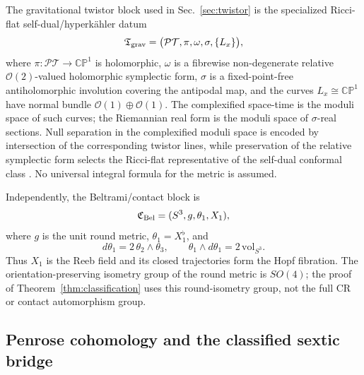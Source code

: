 \documentclass[aps,prd,reprint,nofootinbib,superscriptaddress]{revtex4-2}
\theoremstyle{definition}
\theoremstyle{remark}
\newcommand{\CP}{\mathbb{CP}}
\newcommand{\cO}{\mathcal{O}}
\newcommand{\PT}{\mathcal{PT}}
\begin{document}
The gravitational twistor block used in Sec.~\ref{sec:twistor} is the specialized Ricci-flat self-dual/hyperk\"ahler datum
\begin{equation}
\mathfrak T_{\rm grav}
=\bigl(\PT,\pi,\omega,\sigma,\{L_x\}\bigr),
\label{eq:Tgrav}
\end{equation}
where $\pi:\PT\to\CP^1$ is holomorphic, $\omega$ is a fibrewise non-degenerate relative $\cO(2)$-valued holomorphic symplectic form, $\sigma$ is a fixed-point-free antiholomorphic involution covering the antipodal map, and the curves $L_x\cong\CP^1$ have normal bundle $\cO(1)\oplus\cO(1)$.  The complexified space-time is the moduli space of such curves; the Riemannian real form is the moduli space of $\sigma$-real sections.  Null separation in the complexified moduli space is encoded by intersection of the corresponding twistor lines, while preservation of the relative symplectic form selects the Ricci-flat representative of the self-dual conformal class \cite{Penrose1976,HitchinKarlhede1987}.  No universal integral formula for the metric is assumed.

Independently, the Beltrami/contact block is
\begin{equation}
\mathfrak C_{\rm Bel}=(S^3,g,\theta_1,X_1),
\label{eq:Cbel}
\end{equation}
where $g$ is the unit round metric, $\theta_1=X_1^\flat$, and
\begin{equation}
 d\theta_1=2\,\theta_2\wedge\theta_3,
 \qquad
 \theta_1\wedge d\theta_1=2\,\mathrm{vol}_{S^3}.
\label{eq:contactform}
\end{equation}
Thus $X_1$ is the Reeb field and its closed trajectories form the Hopf fibration.  The orientation-preserving isometry group of the round metric is $SO(4)$; the proof of Theorem~\ref{thm:classification} uses this round-isometry group, not the full CR or contact automorphism group.

\subsection{Penrose cohomology and the classified sextic bridge}
\end{document}
